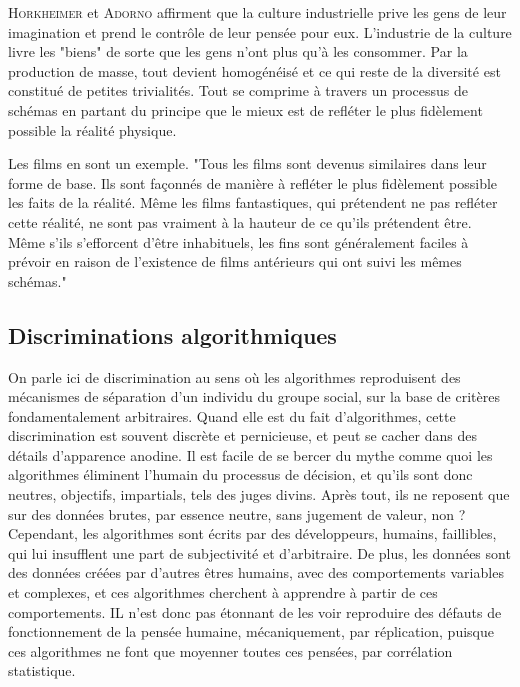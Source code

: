\documentclass[a4paper,14pt]{extreport}
\begin{document}
\textsc{Horkheimer} et \textsc{Adorno} affirment que la culture industrielle prive les gens de leur imagination et prend le contrôle de leur pensée pour eux. L'industrie de la culture livre les "biens" de sorte que les gens n'ont plus qu'à les consommer. Par la production de masse, tout devient homogénéisé et ce qui reste de la diversité est constitué de petites trivialités. Tout se comprime à travers un processus de schémas en partant du principe que le mieux est de refléter le plus fidèlement possible la réalité physique. 

Les films en sont un exemple. "Tous les films sont devenus similaires dans leur forme de base. Ils sont façonnés de manière à refléter le plus fidèlement possible les faits de la réalité. Même les films fantastiques, qui prétendent ne pas refléter cette réalité, ne sont pas vraiment à la hauteur de ce qu'ils prétendent être. Même s'ils s'efforcent d'être inhabituels, les fins sont généralement faciles à prévoir en raison de l'existence de films antérieurs qui ont suivi les mêmes schémas."

\subsection{Discriminations algorithmiques}

On parle ici de discrimination au sens où les algorithmes reproduisent des mécanismes de séparation d'un individu du groupe social, sur la base de critères fondamentalement arbitraires. Quand elle est du fait d'algorithmes, cette discrimination est souvent discrète et pernicieuse, et peut se cacher dans des détails d'apparence anodine. Il est facile de se bercer du mythe comme quoi les algorithmes éliminent l'humain du processus de décision, et qu'ils sont donc neutres, objectifs, impartials, tels des juges divins. Après tout, ils ne reposent que sur des données brutes, par essence neutre, sans jugement de valeur, non ? Cependant, les algorithmes sont écrits par des développeurs, humains, faillibles, qui lui insufflent une part de subjectivité et d'arbitraire. De plus, les données sont des données créées par d'autres êtres humains, avec des comportements variables et complexes, et ces algorithmes cherchent à apprendre à partir de ces comportements. IL n'est donc pas étonnant de les voir reproduire des défauts de fonctionnement de la pensée humaine, mécaniquement, par réplication, puisque ces algorithmes ne font que moyenner toutes ces pensées, par corrélation statistique.
\end{document}

